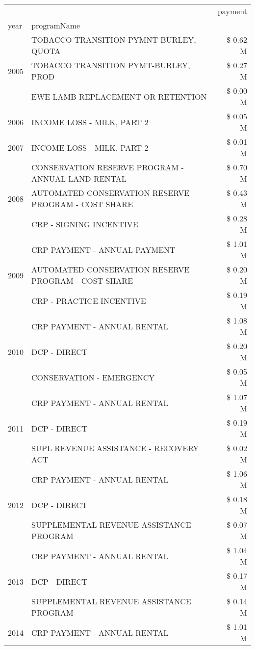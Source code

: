 \begin{tabular}{llr}
\toprule
 &  & payment \\
year & programName &  \\
\midrule
\multirow[t]{3}{*}{2005} & TOBACCO TRANSITION PYMNT-BURLEY, QUOTA & \$ 0.62 M \\
 & TOBACCO TRANSITION PYMT-BURLEY, PROD & \$ 0.27 M \\
 & EWE LAMB REPLACEMENT OR RETENTION & \$ 0.00 M \\
\cline{1-3}
2006 & INCOME LOSS - MILK, PART 2 & \$ 0.05 M \\
\cline{1-3}
2007 & INCOME LOSS - MILK, PART 2 & \$ 0.01 M \\
\cline{1-3}
\multirow[t]{3}{*}{2008} & CONSERVATION RESERVE PROGRAM - ANNUAL LAND RENTAL & \$ 0.70 M \\
 & AUTOMATED CONSERVATION RESERVE PROGRAM - COST SHARE & \$ 0.43 M \\
 & CRP - SIGNING INCENTIVE & \$ 0.28 M \\
\cline{1-3}
\multirow[t]{3}{*}{2009} & CRP PAYMENT - ANNUAL PAYMENT & \$ 1.01 M \\
 & AUTOMATED CONSERVATION RESERVE PROGRAM - COST SHARE & \$ 0.20 M \\
 & CRP - PRACTICE INCENTIVE & \$ 0.19 M \\
\cline{1-3}
\multirow[t]{3}{*}{2010} & CRP PAYMENT - ANNUAL RENTAL & \$ 1.08 M \\
 & DCP - DIRECT & \$ 0.20 M \\
 & CONSERVATION - EMERGENCY & \$ 0.05 M \\
\cline{1-3}
\multirow[t]{3}{*}{2011} & CRP PAYMENT - ANNUAL RENTAL & \$ 1.07 M \\
 & DCP - DIRECT & \$ 0.19 M \\
 & SUPL REVENUE ASSISTANCE - RECOVERY ACT & \$ 0.02 M \\
\cline{1-3}
\multirow[t]{3}{*}{2012} & CRP PAYMENT - ANNUAL RENTAL & \$ 1.06 M \\
 & DCP - DIRECT & \$ 0.18 M \\
 & SUPPLEMENTAL REVENUE ASSISTANCE PROGRAM & \$ 0.07 M \\
\cline{1-3}
\multirow[t]{3}{*}{2013} & CRP PAYMENT - ANNUAL RENTAL & \$ 1.04 M \\
 & DCP - DIRECT & \$ 0.17 M \\
 & SUPPLEMENTAL REVENUE ASSISTANCE PROGRAM & \$ 0.14 M \\
\cline{1-3}
\multirow[t]{3}{*}{2014} & CRP PAYMENT - ANNUAL RENTAL & \$ 1.01 M \\

\end{tabular}
